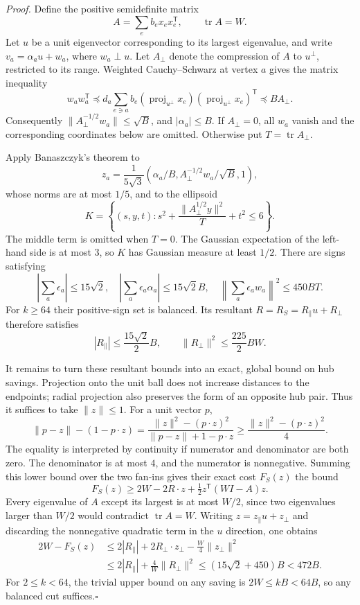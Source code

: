 \emph{Proof.}
Define the positive semidefinite matrix
\[
 A=\sum_e b_e x_e x_e^{\mathsf T},\qquad \operatorname{tr}A=W.
\]
Let $u$ be a unit eigenvector corresponding to its largest eigenvalue, and
write $v_a=\alpha_a u+w_a$, where $w_a\perp u$.  Let $A_\perp$ denote the
compression of $A$ to $u^\perp$, restricted to its range.  Weighted
Cauchy--Schwarz at vertex $a$ gives the matrix inequality
\[
 w_aw_a^{\mathsf T}
 \preceq d_a\sum_{e\ni a}b_e
             (\operatorname{proj}_{u^\perp}x_e)
             (\operatorname{proj}_{u^\perp}x_e)^{\mathsf T}
 \preceq B A_\perp.
\]
Consequently $\|A_\perp^{-1/2}w_a\|\leq\sqrt B$, and
$|\alpha_a|\leq B$.  If $A_\perp=0$, all $w_a$ vanish and the corresponding
coordinates below are omitted.  Otherwise put $T=\operatorname{tr}A_\perp$.

Apply Banaszczyk's theorem to
\[
 z_a=\frac{1}{5\sqrt3}
       \left(\alpha_a/B,A_\perp^{-1/2}w_a/\sqrt B,1\right),
\]
whose norms are at most $1/5$, and to the ellipsoid
\[
 K=\left\{(s,y,t):
 s^2+\frac{\|A_\perp^{1/2}y\|^2}{T}+t^2\leq6\right\}.
\]
The middle term is omitted when $T=0$.  The Gaussian expectation of the
left-hand side is at most $3$, so $K$ has Gaussian measure at least $1/2$.
There are signs satisfying
\[
 \left|\sum_a\epsilon_a\right|\leq15\sqrt2,
 \quad \left|\sum_a\epsilon_a\alpha_a\right|\leq15\sqrt2 B,
 \quad \left\|\sum_a\epsilon_a w_a\right\|^2\leq450BT.
\]
For $k\geq64$ their positive-sign set is balanced.  Its resultant
$R=R_S=R_\parallel u+R_\perp$ therefore satisfies
\[
 |R_\parallel|\leq\frac{15\sqrt2}{2}B,
 \qquad \|R_\perp\|^2\leq\frac{225}{2}BW.
\]

It remains to turn these resultant bounds into an exact, global bound on
hub savings.  Projection onto the unit ball does not increase distances to
the endpoints; radial projection also preserves the form of an opposite
hub pair.  Thus it suffices to take $\|z\|\leq1$.  For a unit vector $p$,
\[
 \|p-z\|-(1-p\cdot z)
 =\frac{\|z\|^2-(p\cdot z)^2}
        {\|p-z\|+1-p\cdot z}
 \geq\frac{\|z\|^2-(p\cdot z)^2}{4}.
\]
The equality is interpreted by continuity if numerator and denominator are
both zero.  The denominator is at most $4$, and the numerator is nonnegative.
Summing this lower bound over the two fan-ins gives their exact cost $F_S(z)$
the bound
\[
 F_S(z)\geq2W-2R\cdot z+\tfrac12z^{\mathsf T}(WI-A)z.
\]
Every eigenvalue of $A$ except its largest is at most $W/2$, since two
eigenvalues larger than $W/2$ would contradict $\operatorname{tr}A=W$.
Writing $z=z_\parallel u+z_\perp$ and discarding the nonnegative quadratic
term in the $u$ direction, one obtains
\[
 \begin{split}
 2W-F_S(z)
 &\leq2|R_\parallel|
       +2R_\perp\cdot z_\perp-\frac W4\|z_\perp\|^2\\
 &\leq2|R_\parallel|+\frac4W\|R_\perp\|^2
 \leq(15\sqrt2+450)B<472B.
 \end{split}
\]
For $2\leq k<64$, the trivial upper bound on any saving is
$2W\leq kB<64B$, so any balanced cut suffices.\hfill$\square$


